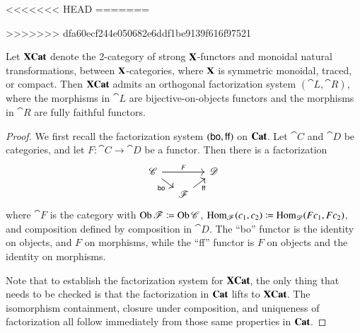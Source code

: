 \documentclass[12pt,oneside,article,draft]{memoir}
\begin{document}
\begin{enumerate}
<<<<<<< HEAD
=======

>>>>>>> dfa60ecf244e050682e6ddf1be9139f616f97521
\begin{lemma}\label{lemma:factorization system}
	Let $\mathbf{XCat}$ denote the 2-category of strong $\mathbf{X}$-functors and monoidal natural transformations, between $\mathbf{X}$-categories, where $\mathbf{X}$ is symmetric monoidal, traced, or compact.
	Then $\mathbf{XCat}$ admits an orthogonal factorization system $(\cat{L},\cat{R})$, where the morphisms in $\cat{L}$ are bijective-on-objects functors and the morphisms in $\cat{R}$ are fully faithful functors.
\end{lemma}
\begin{proof}
	We first recall the factorization system $(\mathsf{bo},\mathsf{ff})$ on $\mathbf{Cat}$.
	Let $\cat{C}$ and $\cat{D}$ be categories, and let $F\colon\cat{C}\to\cat{D}$ be a functor.
	Then there is a factorization
	\[
	\begin{tikzcd}[column sep=small, row sep=small]
		\cat{C} \ar[rr, "F"] \ar[dr, "\bo"'] && \cat{D} \\
		& \cat{F} \ar[ur, "\ff"']
	\end{tikzcd}
	\]
	where $\cat{F}$ is the category with $\operatorname{Ob}\mathscr{F}\coloneqq \operatorname{Ob}\mathscr{C}$, $\operatorname{Hom}_{\mathscr{F}}(c_1,c_2)\coloneqq\operatorname{Hom}_{\mathscr{D}}(Fc_1,Fc_2)$, and composition defined by composition in $\cat{D}$.
	The ``bo'' functor is the identity on objects, and $F$ on morphisms, while the ``ff'' functor is $F$ on objects and the identity on morphisms.

	Note that to establish the factorization system for $\mathbf{XCat}$, the only thing that needs to be checked is that the factorization in $\mathbf{Cat}$ lifts to $\mathbf{XCat}$.
	The isomorphism containment, closure under composition, and uniqueness of factorization all follow immediately from those same properties in $\mathbf{Cat}$.


\end{proof}
\end{enumerate}
\end{document}
